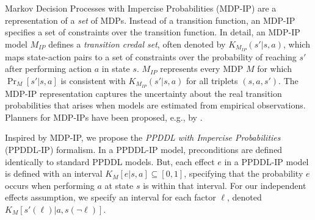 \documentclass[letterpaper]{article} %
\newcommand{\tuple}[1]{\ensuremath{\left \langle #1 \right \rangle }}
\newcommand{\ip}{\textit{IP}}
\begin{document}
Markov Decision Processes with Impercise Probabilities (MDP-IP) \cite{satia1973markovian}
are a representation of a \emph{set} of MDPs. 
Instead of a transition function, an MDP-IP specifies a set of constraints over the transition function. 
In detail, an MDP-IP model $M_{\ip}$ defines a \emph{transition credal set}, often denoted by $K_{M_{\ip}}(s'|s,a)$, which maps state-action pairs to a set of constraints over the probability of reaching $s'$ after performing action $a$ in state $s$. 
$M_{\ip}$ represents every MDP $M$ for which $\Pr_{M}[s'|s,a]$ is consistent with $K_{M_{\ip}}(s'|s,a)$ for all triplets $(s,a,s')$. %
The MDP-IP representation captures the uncertainty about the real transition probabilities that arises when models are estimated from empirical observations.
Planners for MDP-IPs have been proposed, e.g., by \citet{delgado2011efficient}.


Inspired by MDP-IP, we propose the \emph{PPDDL with Impercise Probabilities} (PPDDL-IP) formalism. 
In a PPDDL-IP model, preconditions are defined identically to standard PPDDL models. 
But, each effect $e$ in a PPDDL-IP model is defined with an interval $K_M[e|s,a]\subseteq [0,1]$, specifying that the probability $e$ occurs when performing $a$ at state $s$ is within that interval. 
For our independent effects assumption, we specify an interval for each factor $\ell$, denoted $K_M[s'(\ell)|a,s(\neg \ell)]$.  

\end{document}
